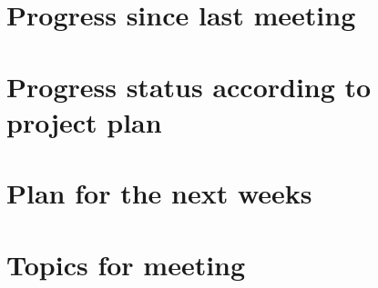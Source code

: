 \documentclass[main.tex]{subfiles}
\begin{document}
\section{Progress since last meeting}
\section{Progress status according to project plan}
\section{Plan for the next weeks}
\section{Topics for meeting}
\end{document}
